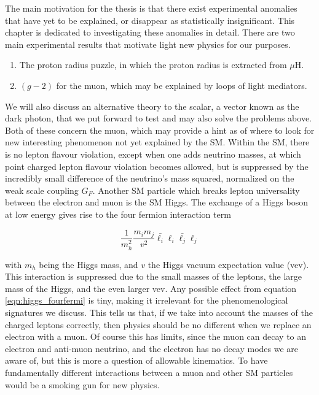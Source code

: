 \label{chapter:review}

The main motivation for the thesis is that there exist experimental anomalies that have yet to be explained, or disappear as statistically insignificant.
This chapter is dedicated to investigating these anomalies in detail.
There are two main experimental results that motivate light new physics for our purposes.

\begin{enumerate}
    \item The proton radius puzzle, in which the proton radius is extracted from $\mu\textrm{H}$.
    \item $(g-2)$ for the muon, which may be explained by loops of light mediators.
\end{enumerate}

We will also discuss an alternative theory to the scalar, a vector known as the dark photon, that we put forward to test and may also solve the problems above.
Both of these concern the muon, which may provide a hint as of where to look for new interesting phenomenon not yet explained by the SM.
Within the SM, there is no lepton flavour violation, except when one adds neutrino masses, at which point charged lepton flavour violation becomes allowed, but is suppressed by the incredibly small difference of the neutrino's mass squared, normalized on the weak scale coupling $G_F$.
Another SM particle which breaks lepton universality between the electron and muon is the SM Higgs.
The exchange of a Higgs boson at low energy gives rise to the four fermion interaction term

\begin{equation}
\label{eqn:higgs_fourfermi}
\frac{1}{m_h^2} \frac{m_i m_j}{v^2} \bar{\ell_i} \ell_i \bar{\ell_j} \ell_j
\end{equation}

\noindent with $m_h$ being the Higgs mass, and $v$ the Higgs vacuum expectation value (vev).
This interaction is suppressed due to the small masses of the leptons, the large mass of the Higgs, and the even larger vev.
Any possible effect from equation \ref{eqn:higgs_fourfermi} is tiny, making it irrelevant for the phenomenological signatures we discuss.
This tells us that, if we take into account the masses of the charged leptons correctly, then physics should be no different when we replace an electron with a muon.
Of course this has limits, since the muon can decay to an electron and anti-muon neutrino, and the electron has no decay modes we are aware of, but this is more a question of allowable kinematics.
To have fundamentally different interactions between a muon and other SM particles would be a smoking gun for new physics.



